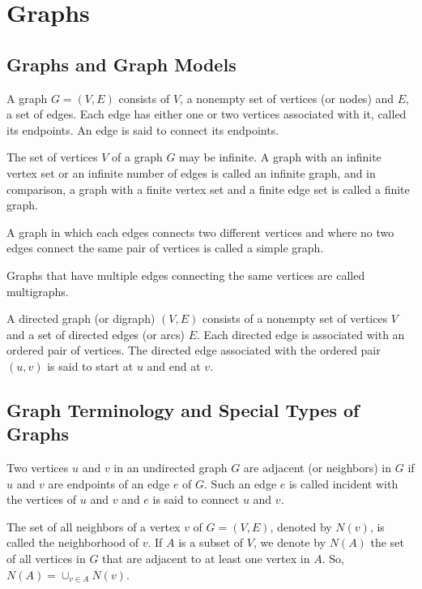 \documentclass[../discrete.tex]{subfiles}
\begin{document}
\chapter{Graphs}
\section{Graphs and Graph Models}
\begin{definition}
    A graph $G=(V,E)$ consists of $V$, a nonempty set of vertices (or nodes) and $E$, a set of edges.
    Each edge has either one or two vertices associated with it, called its endpoints. An edge is said to connect its endpoints.
\end{definition}

The set of vertices $V$ of a graph $G$ may be infinite. A graph with an infinite vertex set or an infinite number of edges is called an infinite graph, and in comparison, a graph 
with a finite vertex set and a finite edge set is called a finite graph. 

A graph in which each edges connects two different vertices and where no two edges connect the same pair of vertices is called a simple graph.

Graphs that have multiple edges connecting the same vertices are called multigraphs.

\begin{definition}
    A directed graph (or digraph) $(V,E)$ consists of a nonempty set of vertices $V$ and a set of directed edges (or arcs) $E$. Each directed edge is associated with an ordered pair of vertices.
    The directed edge associated with the ordered pair $(u,v)$ is said to start at $u$ and end at $v$.
\end{definition}

\section{Graph Terminology and Special Types of Graphs}
\begin{definition}
    Two vertices $u$ and $v$ in an undirected graph $G$ are adjacent (or neighbors) in $G$ if 
    $u$ and $v$ are endpoints of an edge $e$ of $G$. Such an edge $e$ is called incident with the vertices of 
    $u$ and $v$ and $e$ is said to connect $u$ and $v$.
\end{definition}

\begin{definition}
    The set of all neighbors of a vertex $v$ of $G=(V,E)$, denoted by $N(v)$, is called the 
    neighborhood of $v$. If $A$ is a subset of $V$, we denote by $N(A)$ the set of all vertices in 
    $G$ that are adjacent to at least one vertex in $A$. So, $N(A) = \cup_{v\in A}N(v)$.
\end{definition}
\end{document}
